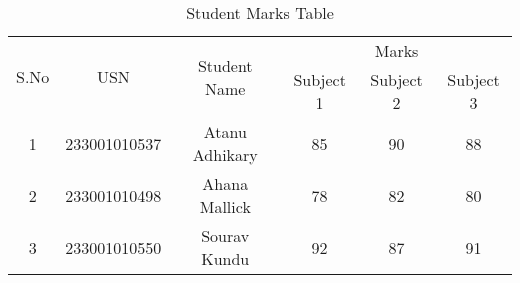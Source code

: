 \documentclass{article}
\begin{document}
\begin{table}[h!]
\centering
\begin{tabular}{|c|c|c|c|c|c|}
\hline
\multirow{2}{*}{S.No} & \multirow{2}{*}{USN} & \multirow{2}{*}{Student Name} & \multicolumn{3}{c|}{Marks} \\ \cline{4-6} 
                      &                      &                               & Subject 1 & Subject 2 & Subject 3 \\ \hline
1                     & 233001010537                & Atanu Adhikary                      & 85        & 90        & 88        \\ \hline
2                     & 233001010498               & Ahana Mallick                    & 78        & 82        & 80        \\ \hline
3                     & 233001010550              & Sourav Kundu                 & 92        & 87        & 91        \\ \hline
\end{tabular}
\caption{Student Marks Table}
\label{tab:student_marks}
\end{table}
\end{document}
